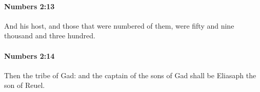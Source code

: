 		\paragraph{Numbers 2:13} %
			\label{NUMBERS-2-13}

			And his host, and those that were numbered of them, were fifty and nine thousand and three hundred.


		\paragraph{Numbers 2:14} %
			\label{NUMBERS-2-14}

			Then the tribe of Gad: and the captain of the sons of Gad shall be Eliasaph the son of Reuel.



